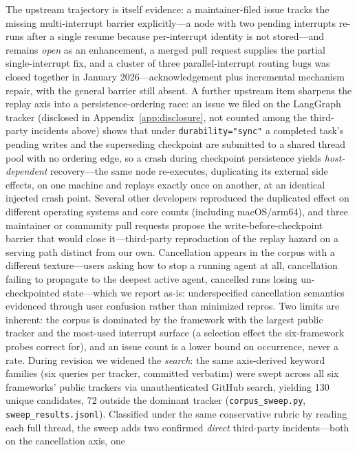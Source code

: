 \documentclass[10pt,journal,compsoc]{IEEEtran}
\begin{document}
The upstream trajectory is itself evidence: a maintainer-filed issue tracks
the missing multi-interrupt barrier explicitly---a node with two pending
interrupts re-runs after a single resume because per-interrupt identity is
not stored---and remains \emph{open} as an enhancement, a merged pull
request supplies the partial single-interrupt fix, and a cluster of three
parallel-interrupt routing bugs was closed together in January
2026---acknowledgement plus incremental mechanism repair, with the general
barrier still absent. A further upstream item sharpens the replay axis into
a persistence-ordering race: an issue we filed on the LangGraph tracker
(disclosed in Appendix~\ref{app:disclosure}, not counted among the
third-party incidents above) shows that under \texttt{durability="sync"} a
completed task's pending writes and the superseding checkpoint are submitted
to a shared thread pool with no ordering edge, so a crash during checkpoint
persistence yields \emph{host-dependent} recovery---the same node
re-executes, duplicating its external side effects, on one machine and
replays exactly once on another, at an identical injected crash point.
Several other developers reproduced the duplicated effect on different
operating systems and core counts (including macOS/arm64), and three
maintainer or community pull requests propose the write-before-checkpoint
barrier that would close it---third-party reproduction of the replay hazard
on a serving path distinct from our own. Cancellation appears in the corpus
with a different texture---users asking how to stop a running agent at all,
cancellation failing to propagate to the deepest active agent, cancelled
runs losing un-checkpointed state---which we report as-is: underspecified
cancellation semantics evidenced through user confusion rather than
minimized repros. Two limits are inherent: the corpus is dominated by the
framework with the largest public tracker and the most-used interrupt
surface (a selection effect the six-framework probes correct for), and an
issue count is a lower bound on occurrence, never a rate. During revision we
widened the \emph{search}: the same axis-derived keyword families (six
queries per tracker, committed verbatim) were swept across all six
frameworks' public trackers via unauthenticated GitHub search, yielding 130
unique candidates, 72 outside the dominant tracker (\texttt{corpus\_sweep.py},
\texttt{sweep\_results.jsonl}). Classified under the same conservative
rubric by reading each full thread, the sweep adds two confirmed
\emph{direct} third-party incidents---both on the cancellation axis, one
\end{document}
